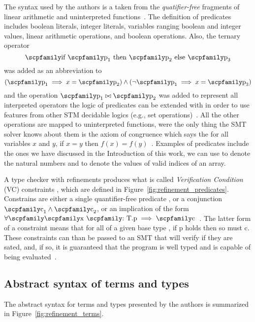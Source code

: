 \documentclass[
  oneside,
  english,
  coorientadorbanca,
  noabntexcite
]{ufsc-thesis-rn46-2019}
\newcommand{\codett}[1]{\text{\scpfamily#1}}
\newcommand{\code}[1]{\text{\scpfamily\setlength\spaceskip{0.35em}#1}}
\newcommand{\typer}[2]{\code{#1 \codett{:} #2}}
\begin{document}
The syntax used by the authors is a taken from the \textit{quatifier-free} fragments of linear arithmetic and uninterpreted functions~\cite{jhala2020tutorial}.
The definition of predicates \code{p} includes boolean literals, integer literals, variables ranging boolean and integer values, linear arithmetic operations, and boolean operations.
Also, the ternary operator
\begin{equation*}
  \code{if $\code{p}_1$ then $\code{p}_2$ else $\code{p}_3$}
\end{equation*}
was added as an abbreviation to
\begin{equation*}
  (\code{p}_1 \implies x = \code{p}_2)\land(\lnot \code{p}_1 \implies x = \code{p}_3)
\end{equation*}
and the operation $\code{p}_1\bowtie\code{p}_2$ was added to represent all interpreted operators the logic of predicates can be extended with in order to use features from other STM decidable logics (e.g., set operations)~\cite{jhala2020tutorial}.
All the other operations are mapped to uninterpreted functions, were the only thing the SMT solver knows about them is the axiom of congruence which says the for all variables $x$ and $y$, if $x = y$ then $f(x) = f(y)$~\cite{jhala2020tutorial}.
Examples of predicates include the ones we have discussed in the Introduction of this work, we can use \code{0 <= v} to denote the natural numbers and \code{0 <= v \&\& v = length(x)} to denote the values of valid indices of an array.

A type checker with refinements produces what is called \textit{Verification Condition} (VC) constraints \code{c}, which are defined in Figure~\ref{fig:refinement_predicates}.
Constrains are either a single quantifier-free predicate \code{p}, or a conjunction $\code{c}_1 \land \code{c}_2$, or an implication of the form $\forall\code{\typer{x}{T}.p}\implies\code{c}$~\cite{jhala2020tutorial}.
The latter form of a constraint means that for all \code{x} of a given base type \code{b}, if p holds then so must c.
These constraints can than be passed to an SMT that will verify if they are sated, and, if so, it is guaranteed that the program is well typed and is capable of being evaluated~\cite{jhala2020tutorial}.

\subsection{Abstract syntax of terms and types}

The abstract syntax for terms and types presented by the authors is summarized in Figure~\ref{fig:refinement_terms}.
\end{document}
